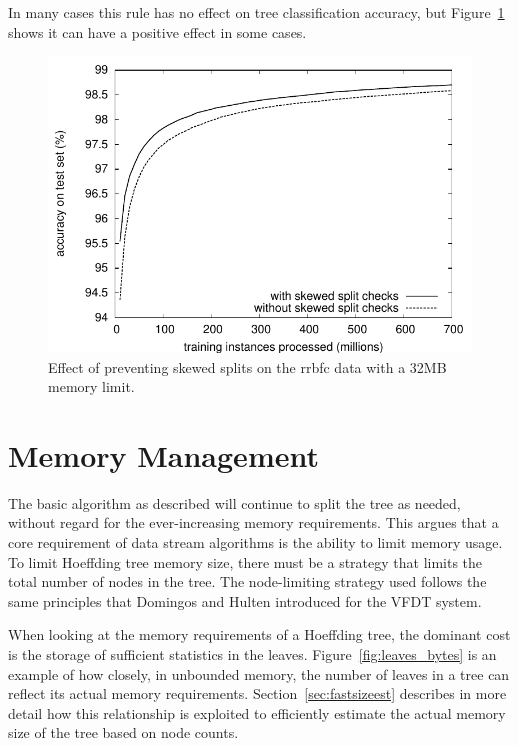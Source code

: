 In many cases this rule has no effect on tree classification accuracy, but Figure~\ref{fig:skewedsplits_rrbfc} shows it can have a positive effect in some cases.

\begin{figure}
\includegraphics{figures/skewedsplits_rrbfc_acc}
\caption{Effect of preventing skewed splits on the {\sc rrbfc} data with a 32MB memory limit.}
\label{fig:skewedsplits_rrbfc}
\end{figure}

\section{Memory Management}
\label{sec:memmanage}

The basic algorithm as described will continue to split the tree as needed, without regard for the ever-increasing memory requirements. This \thesis  argues that a core requirement of data stream algorithms is the ability to limit memory usage. To limit Hoeffding tree memory size, there must be a strategy that limits the total number of nodes in the tree.
The node-limiting strategy used follows the same principles that Domingos and Hulten introduced for the VFDT system.

When looking at the memory requirements of a Hoeffding tree, the dominant cost is the storage of sufficient statistics in the leaves. Figure~\ref{fig:leaves_bytes} is an example of how closely, in unbounded memory, the number of leaves in a tree can reflect its actual memory requirements. Section~\ref{sec:fastsizeest} describes in more detail how this relationship is exploited to efficiently estimate the actual memory size of the tree based on node counts.

